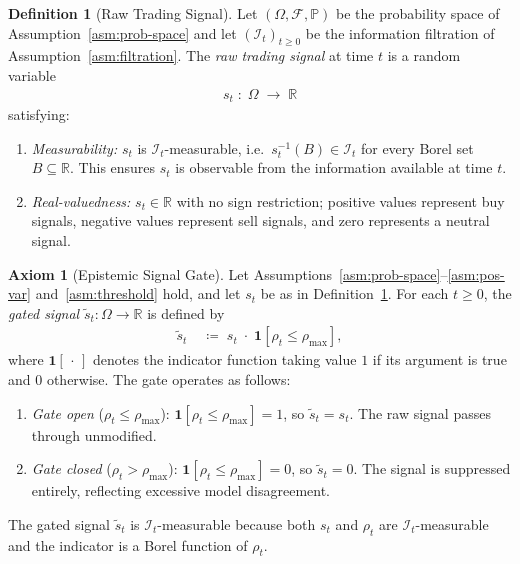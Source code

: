 \documentclass[12pt,openany]{book}
\numberwithin{equation}{chapter}
\theoremstyle{plain}
\theoremstyle{definition}
\newtheorem{definition}[theorem]{Definition}
\newtheorem{axiom}[theorem]{Axiom}
\theoremstyle{remark}
\numberwithin{equation}{chapter}
\theoremstyle{plain}
\begin{document}
\begin{definition}[Raw Trading Signal]
\label{def:raw-signal}
Let $(\Omega, \mathcal{F}, \mathbb{P})$ be the probability space
of Assumption~\ref{asm:prob-space} and let
$(\mathcal{I}_t)_{t \geq 0}$ be the information filtration of
Assumption~\ref{asm:filtration}.  The \emph{raw trading signal}
at time $t$ is a random variable
\begin{align}
  s_t \;:\; \Omega \;\longrightarrow\; \mathbb{R}
  \label{eq:raw-signal-map}
\end{align}
satisfying:
\begin{enumerate}
  \item \emph{Measurability:} $s_t$ is $\mathcal{I}_t$-measurable,
        i.e.\ $s_t^{-1}(B) \in \mathcal{I}_t$ for every Borel set
        $B \subseteq \mathbb{R}$.  This ensures $s_t$ is observable
        from the information available at time $t$.
  \item \emph{Real-valuedness:} $s_t \in \mathbb{R}$ with no sign
        restriction; positive values represent buy signals, negative
        values represent sell signals, and zero represents a neutral
        signal.
\end{enumerate}
\end{definition}

\begin{axiom}[Epistemic Signal Gate]
\label{ax:epistemic-gate}
Let Assumptions~\ref{asm:prob-space}--\ref{asm:pos-var}
and~\ref{asm:threshold} hold, and let $s_t$ be as in
Definition~\ref{def:raw-signal}.  For each $t \geq 0$, the
\emph{gated signal} $\tilde{s}_t : \Omega \to \mathbb{R}$ is
defined by
\begin{align}
  \tilde{s}_t
  &\;\coloneqq\;
  s_t \;\cdot\; \mathbf{1}\!\left[\rho_t \leq \rho_{\max}\right],
  \label{eq:epistemic-gate}
\end{align}
where $\mathbf{1}[\,\cdot\,]$ denotes the indicator function taking
value $1$ if its argument is true and $0$ otherwise.  The gate
operates as follows:
\begin{enumerate}
  \item \emph{Gate open} ($\rho_t \leq \rho_{\max}$):
        $\mathbf{1}[\rho_t \leq \rho_{\max}] = 1$, so
        $\tilde{s}_t = s_t$.  The raw signal passes through
        unmodified.
  \item \emph{Gate closed} ($\rho_t > \rho_{\max}$):
        $\mathbf{1}[\rho_t \leq \rho_{\max}] = 0$, so
        $\tilde{s}_t = 0$.  The signal is suppressed entirely,
        reflecting excessive model disagreement.
\end{enumerate}
The gated signal $\tilde{s}_t$ is $\mathcal{I}_t$-measurable because
both $s_t$ and $\rho_t$ are $\mathcal{I}_t$-measurable and the
indicator is a Borel function of $\rho_t$.
\end{axiom}
\end{document}
